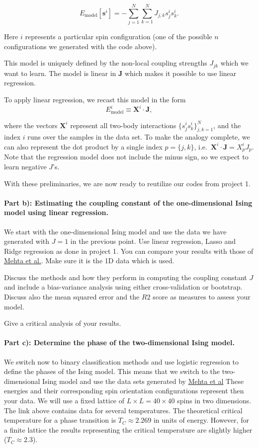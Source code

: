 \documentclass[%
oneside,                 %
final,                   %
10pt]{article}
\begin{document}
\[
E_\mathrm{model}[\boldsymbol{s}^i] = - \sum_{j=1}^N \sum_{k=1}^N J_{j,k}s_{j}^is_{k}^i.
\]

Here $i$ represents a particular spin configuration (one of the possible $n$ configurations we generated with the code above).

This model is uniquely defined by the non-local coupling strengths $J_{jk}$ which we want to learn.
The model is linear in $\mathbf{J}$ which makes it possible to use linear regression.

To apply linear regression, we recast this model in the form
\[
E_\mathrm{model}^i \equiv \mathbf{X}^i \cdot \mathbf{J},
\]

where the vectors $\mathbf{X}^i$ represent all two-body interactions
$\{s_{j}^is_{k}^i \}_{j,k=1}^N$, and the index $i$ runs over the
samples in the data set.  To make the analogy complete, we can also
represent the dot product by a single index $p = \{j,k\}$,
i.e.~$\mathbf{X}^i \cdot \mathbf{J}=X^i_pJ_p$.  Note that the
regression model does not include the minus sign, so we expect to
learn negative $J$'s.

With these preliminaries, we are now ready to  reutilize our codes from project 1. 


\paragraph{Part b): Estimating the coupling constant of the one-dimensional Ising model using linear regression.}
We start with the one-dimensional Ising model and use the data we have
generated with $J=1$ in the previous point. Use linear regression,
Lasso and Ridge regression as done in project 1. You can compare your
results with those of \href{{https://physics.bu.edu/~pankajm/ML-Notebooks/HTML/NB_CVI-linreg_ising.html}}{Mehta
et al.}.
Make sure it is the 1D data which is used.

Discuss the methods and how they perform in computing the coupling
constant $J$ and include a bias-variance analysis using either
cross-validation or bootstrap. Discuss also the mean squared error and
the $R2$ score as measures to assess your model.

Give a critical analysis of your results.


\paragraph{Part c): Determine the phase of the two-dimensional Ising model.}
We switch now to binary classification methods and use logistic
regression to define the phases of the Ising model. This means that we switch to the two-dimensional Ising model
and use the data sets generated by \href{{https://physics.bu.edu/~pankajm/ML-Review-Datasets/isingMC/}}{Mehta et al}
These energies and their corresponding spin orientation configurations 
represent then your data.  We will use a fixed lattice of $L\times L =
40 \times 40$ spins in two dimensions. The link above contains data for several temperatures.
The theoretical critical temperature for a phase transition is $T_C\approx 2.269$ in units of energy.
However, for a finite lattice the results representing the critical temperature are slightly higher ($T_C \approx 2.3$). 
\end{document}
